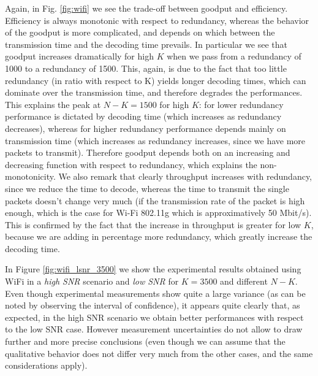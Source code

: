 Again, in Fig. \ref{fig:wifi} we see the trade-off between goodput and efficiency. Efficiency is always monotonic with respect to redundancy, whereas the behavior of the goodput is more complicated, and depends on which between the transmission time and the decoding time prevails. In particular we see that goodput increases dramatically for high $K$ when we pass from a redundancy of 1000 to a redundancy of 1500. This, again, is due to the fact that too little redundancy (in ratio with respect to K) yields longer decoding times, which can dominate over the transmission time, and therefore  degrades the performances. This explains the peak at $N-K=1500$ for high $K$: for lower redundancy performance is dictated by decoding time (which increases as redundancy decreases), whereas for higher redundancy performance depends mainly on transmission time (which increases as redundancy increases, since we have more packets to transmit). Therefore goodput depends both on an increasing and decreasing function with respect to redundancy, which explains the non-monotonicity.  We also remark that clearly throughput increases with redundancy, since we reduce the time to decode, whereas the time to transmit the single packets doesn't change very much (if the transmission rate of the packet is high enough, which is the case for Wi-Fi 802.11g which is approximatively 50 Mbit/s). This is confirmed by the fact that the increase in throughput is greater for low $K$, because we are adding in percentage more redundancy, which greatly increase the decoding time. 

In Figure \ref{fig:wifi_lsnr_3500} we show the experimental results obtained using WiFi in a \textit{high SNR} scenario and \textit{low SNR} for $K=3500$ and different $N-K$. Even though experimental measurements show quite a large variance (as can be noted by observing the interval of confidence), it appears quite clearly that, as expected, in the high SNR scenario we obtain better performances with respect to the low SNR case.  However measurement uncertainties do not allow to draw further and more precise conclusions (even though we can assume that the qualitative behavior does not differ very much from the other cases, and the same considerations apply).

